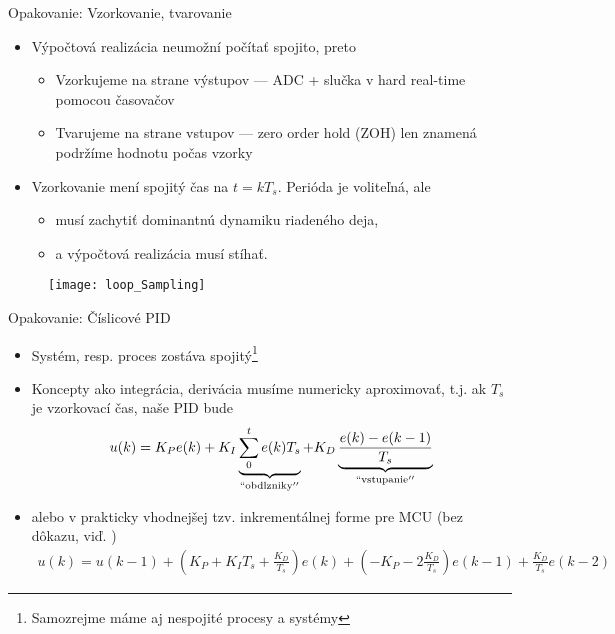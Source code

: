\begin{frame}[t]{Opakovanie: Vzorkovanie, tvarovanie}
  \begin{itemize}
  \item<1-> Výpočtová realizácia neumožní počítať spojito, preto
    \begin{itemize}
      \item Vzorkujeme na strane výstupov --- ADC + slučka v hard real-time pomocou časovačov
      \item Tvarujeme na strane vstupov --- zero order hold (ZOH) len znamená podržíme hodnotu počas vzorky
    \end{itemize}
  \item<2-> Vzorkovanie mení spojitý čas na $t=kT_s$. Perióda je voliteľná, ale
    \begin{itemize}
      \item musí zachytiť dominantnú dynamiku riadeného deja,
      \item a výpočtová realizácia musí stíhať.
  \end{itemize}
\end{itemize}
\begin{figure}
\centering
  \texttt{[image: loop\_Sampling]}\\
\end{figure}
\end{frame}


\begin{frame}[t]{Opakovanie: Číslicové PID}
  \begin{itemize}
    \item<1-> Systém, resp. proces zostáva spojitý\footnote{Samozrejme máme aj nespojité procesy a systémy}
    \item<2-> Koncepty ako integrácia, derivácia musíme numericky aproximovať, t.j. ak $T_s$ je vzorkovací čas, naše PID bude
        \begin{align}
        u(k)= K_Pe(k)+K_I\underbrace{\sum_0^te(k)T_s}_{\mathrm{``obdlzniky''}}+K_D\underbrace{\frac{e(k)-e(k-1)}{T_s}}_{\mathrm{``vstupanie''}}
        \end{align}
    \item<3->  alebo v prakticky vhodnejšej tzv. inkrementálnej forme pre MCU (bez dôkazu, viď. \cite{W:PID})
        {\scriptsize
        \begin{align}
        u(k)=u(k-1)+\left(K_P+K_IT_s+\frac{K_D}{T_s}\right)e(k)+\left(-K_P -2\frac{K_D}{T_s}\right)e(k-1)+\frac{K_D}{T_s}e(k-2)
         \end{align}
         }
\end{itemize}
\end{frame}





% 